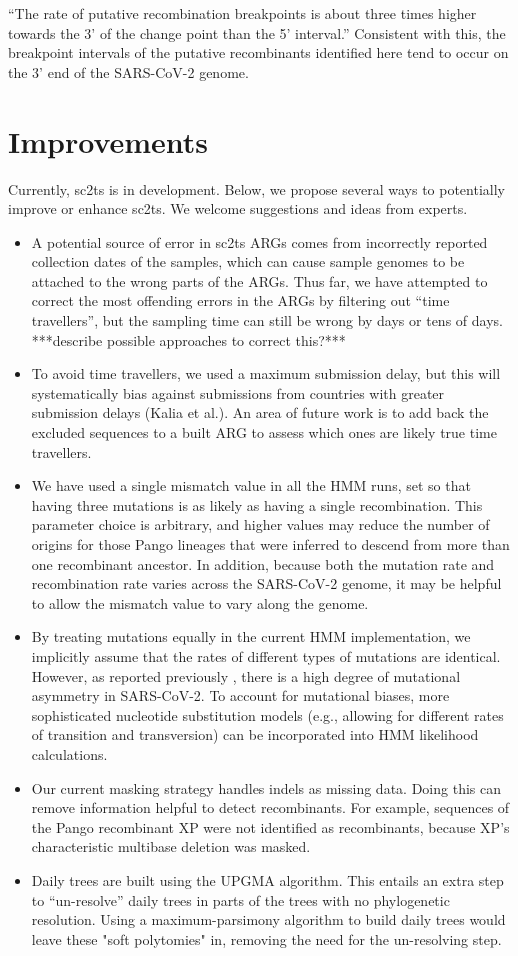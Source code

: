 \documentclass{article}
\begin{document}
``The rate of putative recombination breakpoints is about three times higher towards the 3' of the change point than the 5' interval.'' Consistent with this, the breakpoint intervals of the putative recombinants identified here tend to occur on the 3’ end of the SARS-CoV-2 genome.

\section{Improvements}
Currently, sc2ts is in development. Below, we propose several ways to potentially improve or enhance sc2ts. We welcome suggestions and ideas from experts.

\begin{itemize}
\item A potential source of error in sc2ts ARGs comes from incorrectly reported collection dates of the samples, which can cause sample genomes to be attached to the wrong parts of the ARGs. Thus far, we have attempted to correct the most offending errors in the ARGs by filtering out ``time travellers'', but the sampling time can still be wrong by days or tens of days. ***describe possible approaches to correct this?***
\item To avoid time travellers, we used a maximum submission delay, but this will systematically bias against submissions from countries with greater submission delays (Kalia et al.). An area of future work is to add back the excluded sequences to a built ARG to assess which ones are likely true time travellers.
\item We have used a single mismatch value in all the HMM runs, set so that having three mutations is as likely as having a single recombination. This parameter choice is arbitrary, and higher values may reduce the number of origins for those Pango lineages that were inferred to descend from more than one recombinant ancestor. In addition, because both the mutation rate and recombination rate varies across the SARS-CoV-2 genome, it may be helpful to allow the mismatch value to vary along the genome.
\item By treating mutations equally in the current HMM implementation, we implicitly assume that the rates of different types of mutations are identical. However, as reported previously \citep{Yi2021-sc}, there is a high degree of mutational asymmetry in SARS-CoV-2. To account for mutational biases, more sophisticated nucleotide substitution models (e.g., allowing for different rates of transition and transversion) can be incorporated into HMM likelihood calculations.
\item Our current masking strategy handles indels as missing data. Doing this can remove information helpful to detect recombinants. For example, sequences of the Pango recombinant XP were not identified as recombinants, because XP’s characteristic multibase deletion was masked.
\item Daily trees are built using the UPGMA algorithm. This entails an extra step to ``un-resolve'' daily trees in parts of the trees with no phylogenetic resolution. Using a maximum-parsimony algorithm to build daily trees would leave these "soft polytomies" in, removing the need for the un-resolving step.
\end{itemize}
\end{document}
